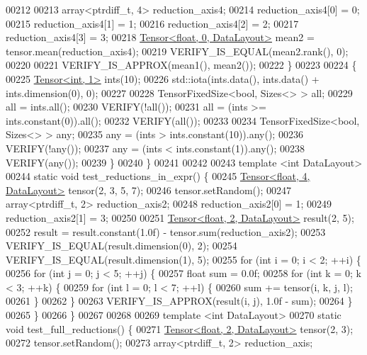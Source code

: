 \begin{DoxyCode}
00212 
00213     array<ptrdiff\_t, 4> reduction\_axis4;
00214     reduction\_axis4[0] = 0;
00215     reduction\_axis4[1] = 1;
00216     reduction\_axis4[2] = 2;
00217     reduction\_axis4[3] = 3;
00218     \hyperlink{class_eigen_1_1_tensor}{Tensor<float, 0, DataLayout>} mean2 = tensor.mean(reduction\_axis4);
00219     VERIFY\_IS\_EQUAL(mean2.rank(), 0);
00220 
00221     VERIFY\_IS\_APPROX(mean1(), mean2());
00222   \}
00223 
00224   \{
00225     \hyperlink{class_eigen_1_1_tensor}{Tensor<int, 1>} ints(10);
00226     std::iota(ints.data(), ints.data() + ints.dimension(0), 0);
00227 
00228     TensorFixedSize<bool, Sizes<> > all;
00229     all = ints.all();
00230     VERIFY(!all());
00231     all = (ints >= ints.constant(0)).all();
00232     VERIFY(all());
00233 
00234     TensorFixedSize<bool, Sizes<> > any;
00235     any = (ints > ints.constant(10)).any();
00236     VERIFY(!any());
00237     any = (ints < ints.constant(1)).any();
00238     VERIFY(any());
00239   \}
00240 \}
00241 
00242 
00243 \textcolor{keyword}{template} <\textcolor{keywordtype}{int} DataLayout>
00244 \textcolor{keyword}{static} \textcolor{keywordtype}{void} test\_reductions\_in\_expr() \{
00245   \hyperlink{class_eigen_1_1_tensor}{Tensor<float, 4, DataLayout>} tensor(2, 3, 5, 7);
00246   tensor.setRandom();
00247   array<ptrdiff\_t, 2> reduction\_axis2;
00248   reduction\_axis2[0] = 1;
00249   reduction\_axis2[1] = 3;
00250 
00251   \hyperlink{class_eigen_1_1_tensor}{Tensor<float, 2, DataLayout>} result(2, 5);
00252   result = result.constant(1.0f) - tensor.sum(reduction\_axis2);
00253   VERIFY\_IS\_EQUAL(result.dimension(0), 2);
00254   VERIFY\_IS\_EQUAL(result.dimension(1), 5);
00255   \textcolor{keywordflow}{for} (\textcolor{keywordtype}{int} i = 0; i < 2; ++i) \{
00256     \textcolor{keywordflow}{for} (\textcolor{keywordtype}{int} j = 0; j < 5; ++j) \{
00257       \textcolor{keywordtype}{float} sum = 0.0f;
00258       \textcolor{keywordflow}{for} (\textcolor{keywordtype}{int} k = 0; k < 3; ++k) \{
00259         \textcolor{keywordflow}{for} (\textcolor{keywordtype}{int} l = 0; l < 7; ++l) \{
00260           sum += tensor(i, k, j, l);
00261         \}
00262       \}
00263       VERIFY\_IS\_APPROX(result(i, j), 1.0f - sum);
00264     \}
00265   \}
00266 \}
00267 
00268 
00269 \textcolor{keyword}{template} <\textcolor{keywordtype}{int} DataLayout>
00270 \textcolor{keyword}{static} \textcolor{keywordtype}{void} test\_full\_reductions() \{
00271   \hyperlink{class_eigen_1_1_tensor}{Tensor<float, 2, DataLayout>} tensor(2, 3);
00272   tensor.setRandom();
00273   array<ptrdiff\_t, 2> reduction\_axis;

\end{DoxyCode}
